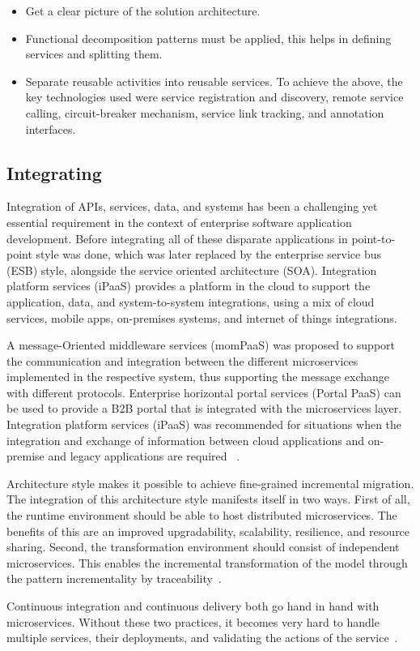 \begin{itemize}
\item Get a clear picture of the solution architecture. 
\item Functional decomposition patterns must be applied, this helps in defining services and splitting them.
\item Separate reusable activities into reusable services.
To achieve the above, the key technologies used were service registration and discovery, remote service calling, circuit-breaker mechanism, service link tracking, and annotation interfaces.
\end{itemize}


\subsection{Integrating}%
Integration of APIs, services, data, and systems has been a challenging yet essential requirement in the context of enterprise software application development. Before integrating all of these disparate applications in point-to-point style was done, which was later replaced by the enterprise service bus (ESB) style, alongside the service oriented architecture (SOA).
Integration platform services (iPaaS) provides a platform in the cloud to support the application, data, and system-to-system integrations, using a mix of cloud services, mobile apps, on-premises systems, and internet of things integrations. 

\par A message-Oriented middleware services (momPaaS) was proposed to support the communication and integration between the different microservices implemented in the respective system, thus supporting the message exchange with different protocols.
Enterprise horizontal portal services (Portal PaaS) can be used to provide a B2B portal that is integrated with the microservices layer.
Integration platform services (iPaaS) was recommended for situations when the integration and exchange of information between cloud applications and on-premise and legacy applications are required ~\cite{rosa2018}.

\par Architecture style makes it possible to achieve fine-grained incremental migration. The integration of this architecture style manifests itself in two ways. First of all, the runtime environment should be able to host distributed microservices. The benefits of this are an improved upgradability, scalability, resilience, and resource sharing.
Second, the transformation environment should consist of independent microservices. This enables the incremental transformation of the model through the pattern incrementality by traceability~\cite{liu2018, overeem2018}.

\par Continuous integration and continuous delivery both go hand in hand with microservices. Without these two practices, it becomes very hard to handle multiple services, their deployments, and validating the actions of the service~\cite{Zhang2019, Kalske2017paper}. 





